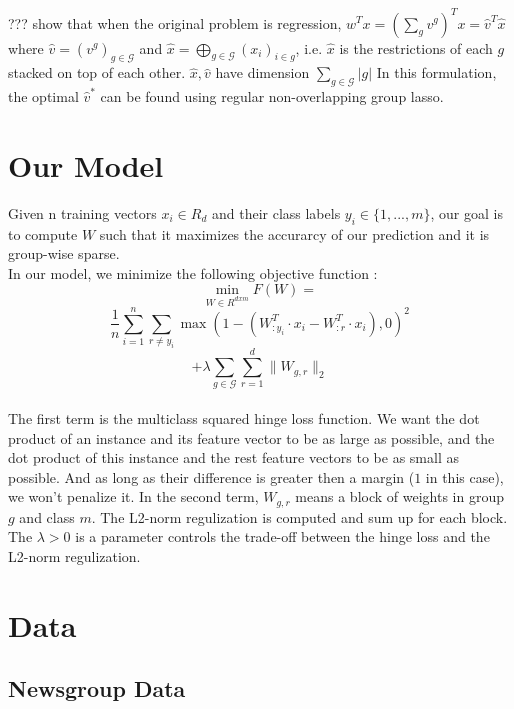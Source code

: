 \documentclass[11pt]{article}
\begin{document}
??? show that when the original problem is regression, 
$w^Tx = \left(\sum_g v^g\right)^Tx = \hat{v}^T \hat{x}$ where 
$\hat{v} = (v^{g})_{g \in \mathcal{G}}$ and
$\hat{x} = \bigoplus_{g \in \mathcal{G} } (x_i)_{i \in g}$, i.e. $\hat{x}$ is
the restrictions of each $g$ stacked on top of each other. $\hat{x}, \hat{v}$ 
have dimension $\sum_{g \in \mathcal{G}} |g|$ 
In this formulation, the optimal $\hat{v}^*$ can be found using regular 
non-overlapping group lasso. 



\section{Our Model}

Given n training vectors $x_i \in R_d$ and their class labels $y_i \in \{1, ..., m\}$, our goal is to compute $W$ such that it maximizes the accurarcy of our prediction and it is group-wise sparse. \\

In our model, we minimize the following objective function : \\

$$ \min_{W \in R^{d x m}} F(W) = $$
$$\frac{1}{n} \sum_{i=1}^{n} \sum_{r \neq y_i } \max(1 - ( W_{:y_i}^T \cdot x_i - W_{:r}^T \cdot x_i) , 0 )^2 $$
$$ + \lambda \sum_{g \in \mathcal{G}} \sum_{r=1}^{d} \| W_{g,r} \|_2$$ \\

The first term is the multiclass squared hinge loss function. We want the dot product of an instance and its feature vector to be as large as possible, and the dot product of this instance and the rest feature vectors to be as small as possible. And as long as their difference is greater then a margin ($1$ in this case), we won't penalize it. In the second term, $W_{g,r}$ means a block of weights in group $g$ and class $m$. The L2-norm regulization is computed and sum up for each block. The $\lambda > 0$ is a parameter controls the trade-off between the hinge loss and the L2-norm regulization.  \\



\section{Data}

\subsection{Newsgroup Data}
\end{document}
